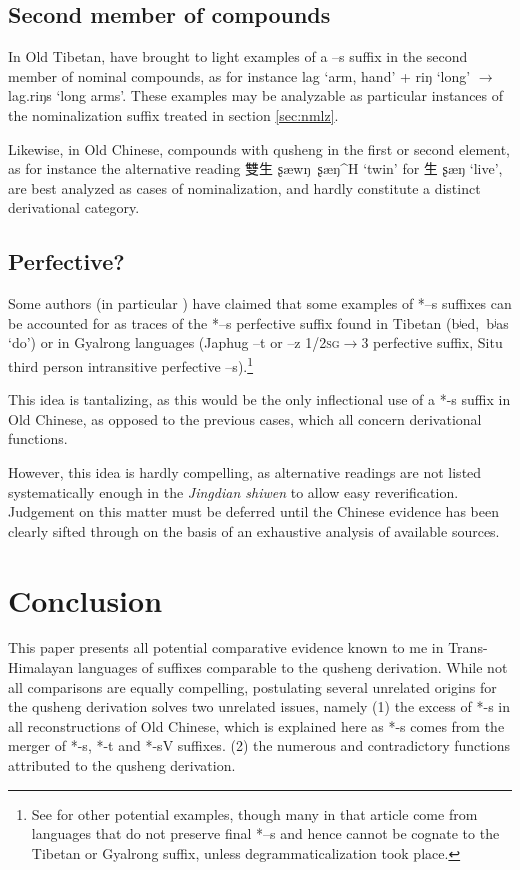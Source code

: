\documentclass[oldfontcommands,oneside,a4paper,11pt]{article}
\newcommand{\ipa}[1]{{\phon \mbox{#1}}} %
\newcommand{\zh}[1]{{\cn #1}}
\newcommand{\ch}[3]{\zh{#1} \ipa{#2} `#3'}
\begin{document}
\subsection{Second member of compounds}
In Old Tibetan, \citet{uebach08rjeblas} have brought to light examples of a \ipa{--s} suffix in the second member of nominal compounds, as for instance \ipa{lag} `arm, hand' + \ipa{riŋ} `long' $\rightarrow$ \ipa{lag.riŋs} `long arms'. These examples may be analyzable as particular instances of the nominalization suffix treated in section \ref{sec:nmlz}.

Likewise, in Old Chinese, compounds with qusheng in the first or second element, as for instance the alternative reading \ch{雙生}{ʂæwŋ ʂæŋ^H}{twin} for \ch{生}{ʂæŋ}{live}, are best analyzed as cases of nominalization, and hardly constitute a distinct derivational category.
 
\subsection{Perfective?} \label{sec:perf}
Some authors (in particular \citealt{jinlx06}) have claimed that some examples of *\ipa{--s} suffixes can be accounted for as traces of the *\ipa{--s} perfective suffix found in Tibetan (\ipa{bʲed, bʲas} `do') or in Gyalrong languages (Japhug \ipa{--t} or \ipa{--z} \textsc{1/2sg}$\rightarrow$3 perfective suffix, Situ third person intransitive perfective \ipa{--s}).\footnote{See \citet{huangbf97s.houzhui} for other potential examples, though many in that article come from languages that do not preserve final *\ipa{--s} and hence cannot be cognate to the Tibetan or Gyalrong suffix, unless degrammaticalization took place.}

This idea is tantalizing, as this would be the only inflectional use of a *\ipa{-s} suffix in Old Chinese, as opposed to the previous cases, which all concern derivational functions.

However, this idea is hardly compelling, as alternative readings are not listed systematically enough in the \textit{Jingdian shiwen} to allow easy reverification. Judgement on this matter must be deferred until the Chinese evidence has been clearly sifted through on the basis of an exhaustive analysis of available sources.

\section{Conclusion}
This paper presents all potential comparative evidence known to me in Trans-Himalayan languages of suffixes comparable to the qusheng derivation. While not all comparisons are equally compelling, postulating several unrelated origins for the qusheng derivation solves two unrelated issues, namely (1) the excess of *\ipa{-s} in all reconstructions of Old Chinese, which is explained here as *\ipa{-s} comes from the merger of *\ipa{-s}, *\ipa{-t} and *\ipa{-sV} suffixes. (2) the numerous and contradictory functions attributed to the qusheng derivation.
\end{document}

